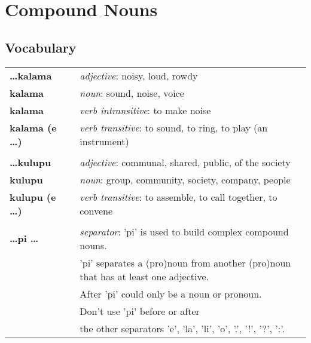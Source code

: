 \section{Compound Nouns}
%
\subsection*{Vocabulary}
%
\begin{supertabular}{p{2,5cm}|ll}
    \textbf{\dots kalama}     &  & \textit{adjective}: noisy, loud, rowdy                               \\ %
    \textbf{kalama}           &  & \textit{noun}: sound, noise, voice                                   \\
    \textbf{kalama}           &  & \textit{verb intransitive}: to make noise                            \\ %
    \textbf{kalama (e \dots)} &  & \textit{verb transitive}: to sound, to ring, to play (an instrument) \\ %
                              &  &                                                                      \\ %
    \textbf{\dots kulupu}     &  & \textit{adjective}: communal, shared, public, of the society         \\ %
    \textbf{kulupu}           &  & \textit{noun}: group, community, society, company, people            \\ %
    \textbf{kulupu (e \dots)} &  & \textit{verb transitive}: to assemble, to call together, to convene  \\ %
                              &  &                                                                      \\ %
    \textbf{\dots pi \dots }  &  & \textit{separator}: 'pi' is used to build complex compound nouns.    \\ && 'pi' separates a (pro)noun from another (pro)noun that has at least one adjective. \\ && After 'pi' could only be a noun or pronoun. \\ && Don't use 'pi' before or after \\ && the other separators 'e', 'la', 'li', 'o', '.', '!', '?', ':'.  \\ %
\end{supertabular} \\
%
\newpage
%
